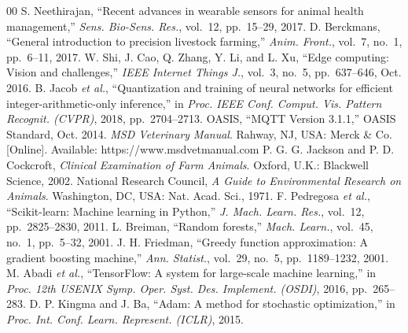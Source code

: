 \documentclass[conference]{IEEEtran}
\begin{document}
\begin{thebibliography}{00}
 S. Neethirajan, ``Recent advances in wearable sensors
for animal health management,'' \textit{Sens. Bio-Sens. Res.}, vol.~12,
pp.~15--29, 2017.
 D. Berckmans, ``General introduction to precision
livestock farming,'' \textit{Anim. Front.}, vol.~7, no.~1, pp.~6--11, 2017.
 W. Shi, J. Cao, Q. Zhang, Y. Li, and L. Xu, ``Edge
computing: Vision and challenges,'' \textit{IEEE Internet Things J.}, vol.~3,
no.~5, pp.~637--646, Oct. 2016.
 B. Jacob \textit{et al.}, ``Quantization and training
of neural networks for efficient integer-arithmetic-only inference,'' in
\textit{Proc. IEEE Conf. Comput. Vis. Pattern Recognit. (CVPR)}, 2018,
pp.~2704--2713.
 OASIS, ``MQTT Version 3.1.1,'' OASIS Standard, Oct. 2014.
 \textit{MSD Veterinary Manual}. Rahway, NJ, USA: Merck \& Co.
[Online]. Available: https://www.msdvetmanual.com
 P. G. G. Jackson and P. D. Cockcroft, \textit{Clinical
Examination of Farm Animals}. Oxford, U.K.: Blackwell Science, 2002.
 National Research Council, \textit{A Guide to Environmental
Research on Animals}. Washington, DC, USA: Nat. Acad. Sci., 1971.
 F. Pedregosa \textit{et al.}, ``Scikit-learn: Machine
learning in Python,'' \textit{J. Mach. Learn. Res.}, vol.~12, pp.~2825--2830,
2011.
 L. Breiman, ``Random forests,'' \textit{Mach. Learn.},
vol.~45, no.~1, pp.~5--32, 2001.
 J. H. Friedman, ``Greedy function approximation: A
gradient boosting machine,'' \textit{Ann. Statist.}, vol.~29, no.~5,
pp.~1189--1232, 2001.
 M. Abadi \textit{et al.}, ``TensorFlow: A system for
large-scale machine learning,'' in \textit{Proc. 12th USENIX Symp. Oper. Syst.
Des. Implement. (OSDI)}, 2016, pp.~265--283.
 D. P. Kingma and J. Ba, ``Adam: A method for stochastic
optimization,'' in \textit{Proc. Int. Conf. Learn. Represent. (ICLR)}, 2015.
\end{thebibliography}
\end{document}
